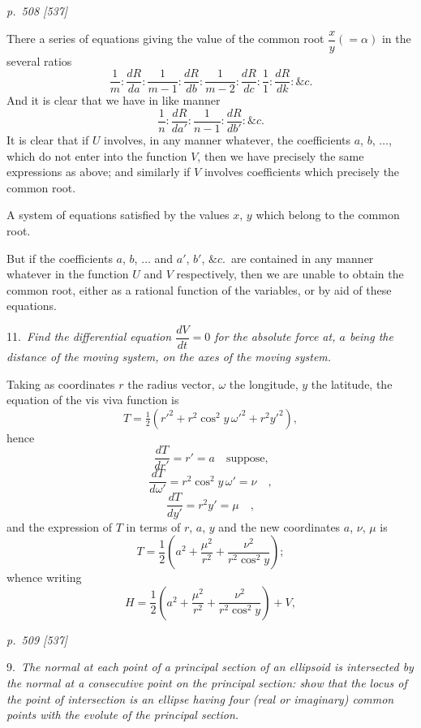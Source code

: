 \documentclass[11pt,a4paper]{book}
\begin{document}
\clearpage

\bigskip
\textit{p.~508 [537]}
\smallskip

\noindent
There a series of equations giving the value of the common root $\dfrac{x}{y}(=\alpha)$ in the several ratios
\[
\frac{1}{m}: \frac{dR}{da}: \frac{1}{m-1}: \frac{dR}{db}: \frac{1}{m-2}: \frac{dR}{dc}: \frac{1}{1}: \frac{dR}{dk}: \&c.
\]
And it is clear that we have in like manner
\[
\frac{1}{n}: \frac{dR}{da'}: \frac{1}{n-1}: \frac{dR}{db'}: \&c.
\]
It is clear that if $U$ involves, in any manner whatever, the coefficients $a$, $b$, $\ldots$,
which do not enter into the function $V$, then we have precisely the same expressions
as above; and similarly if $V$ involves coefficients which precisely the common root.

A system of equations satisfied by the values $x$, $y$ which belong to the common root.

But if the coefficients $a$, $b$, $\ldots$ and $a'$, $b'$, $\&c.$\, are contained in any manner whatever
in the function $U$ and $V$ respectively, then we are unable to obtain the common root,
either as a rational function of the variables, or by aid of these equations.

\smallskip
\noindent\textsc{11.}\, \textit{Find the differential equation $\dfrac{dV}{dt} = 0$ for the absolute force at, $a$ being the
distance of the moving system, on the axes of the moving system.}

Taking as coordinates $r$ the radius vector, $\omega$ the longitude, $y$ the latitude, the
equation of the vis viva function is
\[
T = \tfrac{1}{2}(r'^2 + r^2\cos^2 y\,\omega'^2 + r^2 y'^2),
\]
hence
\[
\frac{dT}{dr'} = r' = a \quad \text{suppose,}
\]
\[
\frac{dT}{d\omega'} = r^2\cos^2 y\,\omega' = \nu \quad ,
\]
\[
\frac{dT}{dy'} = r^2 y' = \mu \quad ,
\]
and the expression of $T$ in terms of $r$, $a$, $y$ and the new coordinates $a$, $\nu$, $\mu$ is
\[
T = \frac{1}{2}\left(a^2 + \frac{\mu^2}{r^2} + \frac{\nu^2}{r^2\cos^2 y}\right);
\]
whence writing
\[
H = \frac{1}{2}\left(a^2 + \frac{\mu^2}{r^2} + \frac{\nu^2}{r^2\cos^2 y}\right) + V,
\]

\clearpage

\bigskip
\textit{p.~509 [537]}
\smallskip

\noindent
\textsc{9.}\, \textit{The normal at each point of a principal section of an ellipsoid is intersected
by the normal at a consecutive point on the principal section: show that the locus
of the point of intersection is an ellipse having four (real or imaginary) common points
with the evolute of the principal section.}
\end{document}

